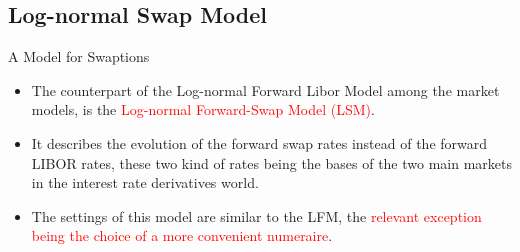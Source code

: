 \documentclass{beamer}
\begin{document}

\subsection{Log-normal Swap Model}
\begin{frame}{A Model for Swaptions}
  \begin{itemize}
  \item<1-> The counterpart of the Log-normal Forward Libor Model among the market models, is the \textcolor{red}{Log-normal Forward-Swap Model (LSM)}.
  \item<2-> It describes the evolution of the forward swap rates instead of the forward LIBOR rates, these two kind of rates being the bases of the two main markets in the interest rate derivatives world. 
  \item<3-> The settings of this model are similar to the LFM, the \textcolor{red}{relevant exception being the choice of a more convenient numeraire}.
  \end{itemize}
\end{frame}
\end{document}
